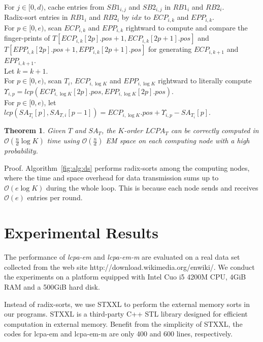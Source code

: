 \documentclass{llncs}
\newtheorem{thm}{Theorem}
\begin{document}
\begin{algorithm}[hbtp!]
{{For $j\in[0,d)$, cache entries from $SB1_{i,j}$ and $SB2_{i,j}$ in $RB1_i$ and $RB2_i$. \\
Radix-sort entries in $RB1_i$ and $RB2_i$ by $idx$ to $ECP_{i,k}$ and $EPP_{i,k}$. \\
For $p\in [0,e)$, scan $ECP_{i,k}$ and $EPP_{i,k}$ rightward to compute and compare the finger-prints of $T[ECP_{i,k}[2p].pos+1, ECP_{i,k}[2p+1].pos]$ and $T[EPP_{i,k}[2p].pos+1, EPP_{i,k}[2p+1].pos]$ for generating $ECP_{i,k+1}$ and $EPP_{i,k+1}$. \\
Let $k=k+1$. \\
}
For $p\in [0,e)$, scan $T_i$, $ECP_{i,\log K}$ and $EPP_{i,\log K}$ rightward to literally compute $\Upsilon_{i,p}=lcp(ECP_{i,\log K}[2p].pos,EPP_{i,\log K}[2p].pos)$. \\
For $p\in [0,e)$, let $lcp(SA_{T_i}[p],SA_{T,i}[p-1])=ECP_{i,\log K}.pos + \Upsilon_{i,p} - SA_{T_i}[p]$. \\
}
\end{algorithm}

\begin{thm}
\label{thm:lcp:pdm}
Given $T$ and $SA_T$, the $K$-order $LCPA_T$ can be correctly computed in $\mathcal{O}(\frac{n}{d}\log K)$ time using $\mathcal{O}(\frac{n}{d})$ {EM} space on each computing node with a high probability.
\end{thm}
Proof. Algorithm~\ref{fig:alg:ds} performs radix-sorts among the computing nodes, where the time and space overhead for data transmission sums up to $\mathcal{O}(e\log K)$ during the whole loop. This is because each node sends and receives $\mathcal{O}(e)$ entries per round.



\section{Experimental Results}\label{sec:experimental_results}

The performance of {\em lcpa-em} and {\em lcpa-em-m} are evaluated on a real data set collected from the web site http://download.wikimedia.org/enwiki/. We conduct the experiments on a platform equipped with Intel Cuo i5 4200M CPU, 4GiB RAM and a 500GiB hard disk.

Instead of radix-sorts, we use {STXXL}\cite{Dementiev2007} to perform the external memory sorts in our programs. {STXXL} is a third-party {C++} {STL} library designed for efficient computation in external memory. Benefit from the simplicity of {STXXL}, the codes for {lcpa-em} and {lcpa-em-m} are only 400 and 600 lines, respectively. 
\end{document}
